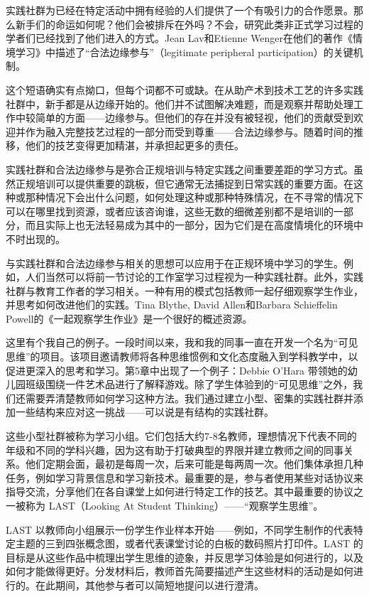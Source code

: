 实践社群为已经在特定活动中拥有经验的人们提供了一个有吸引力的合作愿景。那么新手们的命运如何呢？他们会被排斥在外吗？不会，研究此类非正式学习过程的学者们已经找到了他们进入的方式。Jean Lav和Etienne Wenger在他们的著作《情境学习》中描述了“合法边缘参与”（legitimate peripheral participation）的关键机制。

这个短语确实有点拗口，但每个词都不可或缺。在从助产术到技术工艺的许多实践社群中，新手都是从边缘开始的。他们并不试图解决难题，而是观察并帮助处理工作中较简单的方面——边缘参与。但他们的存在并没有被轻视，他们的贡献受到欢迎并作为融入完整技艺过程的一部分而受到尊重——合法边缘参与。随着时间的推移，他们的技艺变得更加精湛，并承担起更多的责任。

实践社群和合法边缘参与是弥合正规培训与特定实践之间重要差距的学习方式。虽然正规培训可以提供重要的跳板，但它通常无法捕捉到日常实践的重要方面。在这种或那种情况下会出什么问题，如何处理这种或那种特殊情况，在不寻常的情况下可以在哪里找到资源，或者应该咨询谁，这些无数的细微差别都不是培训的一部分，而且实际上也无法轻易成为其中的一部分，因为它们是在高度情境化的环境中不时出现的。

与实践社群和合法边缘参与相关的思想可以应用于在正规环境中学习的学生。例如，人们当然可以将前一节讨论的工作室学习过程视为一种实践社群。此外，实践社群与教育工作者的学习相关。一种有用的模式包括教师一起仔细观察学生作业，并思考如何改进他们的实践。Tina Blythe, David Allen和Barbara Schieffelin Powell的《一起观察学生作业》是一个很好的概述资源。

这里有个我自己的例子。一段时间以来，我和我的同事一直在开发一个名为“可见思维”的项目。该项目邀请教师将各种思维惯例和文化态度融入到学科教学中，以促进更深入的思考和学习。第5章中出现了一个例子：Debbie O’Hara 带领她的幼儿园班级围绕一件艺术品进行了解释游戏。除了学生体验到的“可见思维”之外，我们还需要弄清楚教师如何学习这种方法。我们通过建立小型、密集的实践社群并添加一些结构来应对这一挑战——可以说是有结构的实践社群。

这些小型社群被称为学习小组。它们包括大约7-8名教师，理想情况下代表不同的年级和不同的学科兴趣，因为这有助于打破典型的界限并建立教师之间的同事关系。他们定期会面，最初是每周一次，后来可能是每两周一次。他们集体承担几种任务，例如学习背景信息和学习新技术。最重要的是，参与者使用某些对话协议来指导交流，分享他们在各自课堂上如何进行特定工作的技艺。其中最重要的协议之一被称为 LAST（Looking At Student Thinking）——“观察学生思维”。

LAST 以教师向小组展示一份学生作业样本开始——例如，不同学生制作的代表特定主题的三到四张概念图，或者代表课堂讨论的白板的数码照片打印件。LAST 的目标是从这些作品中梳理出学生思维的迹象，并反思学习体验是如何进行的，以及如何才能做得更好。分发材料后，教师首先简要描述产生这些材料的活动是如何进行的。在此期间，其他参与者可以简短地提问以进行澄清。

